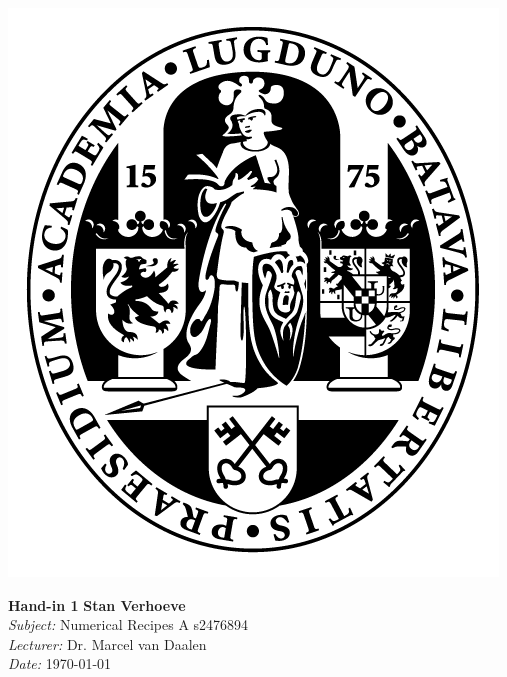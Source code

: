 \documentclass[hidelinks,a4paper,11pt]{article}
\begin{document}
\parbox{0.11\textwidth}{\includegraphics[width=\linewidth]{UL.png}}
\hspace{0.5cm}
\parbox{0.89\textwidth - 0.5cm}{
	\Large\textbf{Hand-in 1} \hspace*{\fill} \normalsize\textbf{Stan Verhoeve}\\
	\textit{Subject:} Numerical Recipes A \hspace*{\fill}s2476894\\
	\textit{Lecturer:} Dr. Marcel van Daalen\\
	\textit{Date:} \today
}



\end{document}
